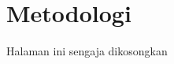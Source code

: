 \chapter{Metodologi}













\newpage
\thispagestyle{empty}
\vspace*{\fill}
    \begin{center}
	Halaman ini sengaja dikosongkan
    \end{center}
\vspace*{\fill}
\pagebreak
